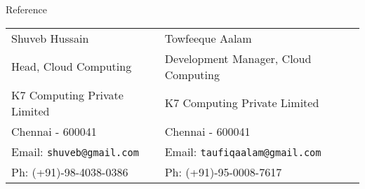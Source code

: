 \documentclass{resume}
\begin{document}

\begin{category}{Reference}
  \citemnobullet \\
  \begin{tabular}{ll}Shuveb Hussain&Towfeeque Aalam\\
    Head, Cloud Computing&Development Manager, Cloud Computing\\
    K7 Computing Private Limited&K7 Computing Private Limited\\
    Chennai - 600041&Chennai - 600041\\
    Email: \mbox{\small\tt shuveb@gmail.com}&Email: \mbox{\small\tt taufiqaalam@gmail.com}\\
    Ph: (+91)-98-4038-0386&Ph: (+91)-95-0008-7617
  \end{tabular}
\end{category}
\end{document}
